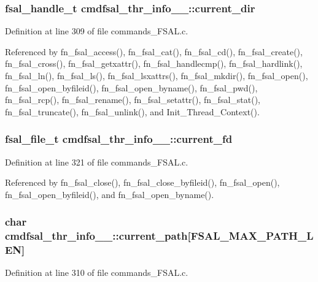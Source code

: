 \subsubsection{\setlength{\rightskip}{0pt plus 5cm}fsal\_\-handle\_\-t {\bf cmdfsal\_\-thr\_\-info\_\-\_\-::current\_\-dir}}\label{structcmdfsal__thr__info_____o1}




Definition at line 309 of file commands\_\-FSAL.c.

Referenced by fn\_\-fsal\_\-access(), fn\_\-fsal\_\-cat(), fn\_\-fsal\_\-cd(), fn\_\-fsal\_\-create(), fn\_\-fsal\_\-cross(), fn\_\-fsal\_\-getxattr(), fn\_\-fsal\_\-handlecmp(), fn\_\-fsal\_\-hardlink(), fn\_\-fsal\_\-ln(), fn\_\-fsal\_\-ls(), fn\_\-fsal\_\-lsxattrs(), fn\_\-fsal\_\-mkdir(), fn\_\-fsal\_\-open(), fn\_\-fsal\_\-open\_\-byfileid(), fn\_\-fsal\_\-open\_\-byname(), fn\_\-fsal\_\-pwd(), fn\_\-fsal\_\-rcp(), fn\_\-fsal\_\-rename(), fn\_\-fsal\_\-setattr(), fn\_\-fsal\_\-stat(), fn\_\-fsal\_\-truncate(), fn\_\-fsal\_\-unlink(), and Init\_\-Thread\_\-Context().
\subsubsection{\setlength{\rightskip}{0pt plus 5cm}fsal\_\-file\_\-t {\bf cmdfsal\_\-thr\_\-info\_\-\_\-::current\_\-fd}}\label{structcmdfsal__thr__info_____o6}




Definition at line 321 of file commands\_\-FSAL.c.

Referenced by fn\_\-fsal\_\-close(), fn\_\-fsal\_\-close\_\-byfileid(), fn\_\-fsal\_\-open(), fn\_\-fsal\_\-open\_\-byfileid(), and fn\_\-fsal\_\-open\_\-byname().
\subsubsection{\setlength{\rightskip}{0pt plus 5cm}char {\bf cmdfsal\_\-thr\_\-info\_\-\_\-::current\_\-path}[FSAL\_\-MAX\_\-PATH\_\-LEN]}\label{structcmdfsal__thr__info_____o2}




Definition at line 310 of file commands\_\-FSAL.c.


